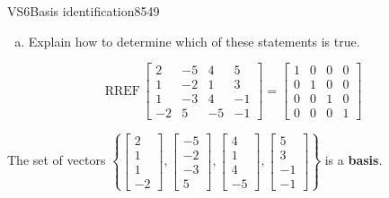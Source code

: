 \begin{exercise}{VS6}{Basis identification}{8549}
\begin{exerciseStatement}
\begin{enumerate}[(a)]
\begin{itemize}
 
\end{itemize}

     
\item  

 Explain how to determine which of these statements is true. 

 
\end{enumerate}

     \end{exerciseStatement}
 \begin{exerciseAnswer} 

 \[
\mathrm{RREF}\, \left[\begin{array}{cccc}
2 & -5 & 4 & 5 \\
1 & -2 & 1 & 3 \\
1 & -3 & 4 & -1 \\
-2 & 5 & -5 & -1
\end{array}\right] = \left[\begin{array}{cccc}
1 & 0 & 0 & 0 \\
0 & 1 & 0 & 0 \\
0 & 0 & 1 & 0 \\
0 & 0 & 0 & 1
\end{array}\right]
            \] 

 

 The set of vectors \(\left\{ \left[\begin{array}{c}
2 \\
1 \\
1 \\
-2
\end{array}\right] , \left[\begin{array}{c}
-5 \\
-2 \\
-3 \\
5
\end{array}\right] , \left[\begin{array}{c}
4 \\
1 \\
4 \\
-5
\end{array}\right] , \left[\begin{array}{c}
5 \\
3 \\
-1 \\
-1
\end{array}\right] \right\}\) is a \textbf{basis}. 

 \end{exerciseAnswer}
 \end{exercise}


